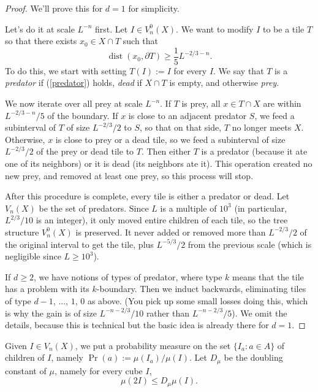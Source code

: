 \documentclass[reqno,12pt]{amsart}
\DeclareMathOperator{\dist}{dist}
\newcommand{\dfn}[1]{\emph{#1}\index{#1}}
\theoremstyle{definition}
\numberwithin{equation}{section}
\begin{document}
\begin{proof}
We'll prove this for $d = 1$ for simplicity.

Let's do it at scale $L^{-n}$ first.
Let $I \in V^0_n(X)$.
We want to modify $I$ to be a tile $T$ so that there exists $x_0 \in X \cap T$ such that 
\begin{equation}\label{predator}
    \dist(x_0, \partial T) \geq \frac{1}{5} L^{-2/3-n}.
\end{equation}
To do this, we start with setting $T(I) := I$ for every $I$.
We say that $T$ is a \dfn{predator} if (\ref{predator}) holds, \dfn{dead} if $X \cap T$ is empty, and otherwise \dfn{prey}.

We now iterate over all prey at scale $L^{-n}$.
If $T$ is prey, all $x \in T \cap X$ are within $L^{-2/3-n}/5$ of the boundary.
If $x$ is close to an adjacent predator $S$, we feed a subinterval of $T$ of size $L^{-2/3}/2$ to $S$, so that on that side, $T$ no longer meets $X$.
Otherwise, $x$ is close to prey or a dead tile, so we feed a subinterval of size $L^{-2/3}/2$ of the prey or dead tile to $T$.
Then either $T$ is a predator (because it ate one of its neighbors) or it is dead (its neighbors ate it).
This operation created no new prey, and removed at least one prey, so this process will stop.

After this procedure is complete, every tile is either a predator or dead.
Let $V_n(X)$ be the set of predators.
Since $L$ is a multiple of $10^3$ (in particular, $L^{2/3}/10$ is an integer), it only moved entire children of each tile, so the tree structure $V^0_n(X)$ is preserved.
It never added or removed more than $L^{-2/3}/2$ of the original interval to get the tile, plus $L^{-5/3}/2$ from the previous scale (which is negligible since $L \geq 10^3$).

If $d \geq 2$, we have notions of types of predator, where type $k$ means that the tile has a problem with its $k$-boundary.
Then we induct backwards, eliminating tiles of type $d - 1$, ..., $1$, $0$ as above.
(You pick up some small losses doing this, which is why the gain is of size $L^{-n-2/3}/10$ rather than $L^{-n-2/3}/5$).
We omit the details, because this is technical but the basic idea is already there for $d = 1$.
\end{proof}

Given $I \in V_n(X)$, we put a probability measure on the set $\{I_a: a \in A\}$ of children of $I$, namely $\Pr(a) := \mu(I_a)/\mu(I)$.
Let $D_\mu$ be the doubling constant of $\mu$, namely for every cube $I$,
$$\mu(2I) \leq D_\mu \mu(I).$$
\end{document}
